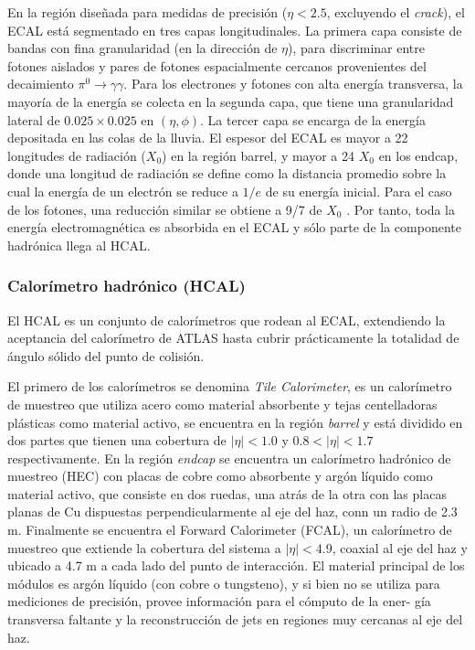 En la región diseñada para medidas de precisión ($\eta < 2.5$, excluyendo el \textit{crack}),
el ECAL está segmentado en tres capas longitudinales. La primera capa consiste de
bandas con fina granularidad (en la dirección de $\eta$), para discriminar entre fotones
aislados y pares de fotones espacialmente cercanos provenientes del decaimiento
$\pi^0\to\gamma\gamma$. Para los electrones y fotones con alta energía transversa, la mayoría
de la energía se colecta en la segunda capa, que tiene una granularidad lateral de
$0.025 \times 0.025$ en $(\eta, \phi)$. La tercer capa se encarga de la energía depositada en las
colas de la lluvia.
El espesor del ECAL es mayor a 22 longitudes de radiación ($X_0$) en la región
barrel, y mayor a 24 $X_0$ en los endcap, donde una longitud de radiación se define
como la distancia promedio sobre la cual la energía de un electrón se reduce a $1/e$
de su energía inicial. Para el caso de los fotones, una reducción similar se obtiene a
9/7 de $X_0$ . Por tanto, toda la energía electromagnética es absorbida en el ECAL y
sólo parte de la componente hadrónica llega al HCAL.

\subsubsection{Calorímetro hadrónico (HCAL)}

El HCAL es un conjunto de calorímetros que rodean al ECAL, extendiendo la aceptancia del calorímetro de ATLAS hasta cubrir prácticamente la totalidad de ángulo sólido del punto de colisión.

El primero de los calorímetros se denomina \textit{Tile Calorimeter}, es un calorímetro de muestreo que utiliza acero como material absorbente y tejas centelladoras plásticas como material activo, se encuentra en la región \textit{barrel} y está dividido en dos partes que tienen una cobertura de $|\eta|<1.0$ y $0.8<|\eta|<1.7$ respectivamente. 
En la región \textit{endcap} se encuentra un calorímetro hadrónico de muestreo (HEC) con placas de cobre como absorbente y argón líquido como material activo, que consiste en dos ruedas, una atrás de la otra con las placas planas de Cu dispuestas perpendicularmente al eje del haz, conn un radio de 2.3 m. Finalmente se encuentra el Forward Calorimeter (FCAL), un calorímetro de muestreo que extiende la cobertura del sistema a $|\eta|<4.9$, coaxial
al eje del haz y ubicado a 4.7 m a cada lado del punto de interacción. El material
principal de los módulos es argón líquido (con cobre o tungsteno), y si bien no se
utiliza para mediciones de precisión, provee información para el cómputo de la ener-
gía transversa faltante y la reconstrucción de jets en regiones muy cercanas al eje
del haz.



